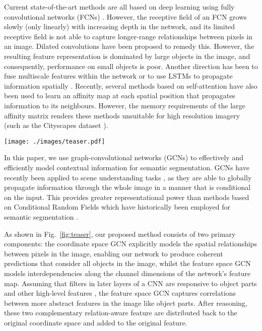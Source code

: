 \documentclass{bmvc2k}
\begin{document}
Current state-of-the-art methods are all based on deep learning using fully convolutional networks (FCNs) \cite{fcn}.
However, the receptive field of an FCN grows slowly (only linearly) with increasing depth in the network, and its limited receptive field is not able to capture longer-range relationships between pixels in an image.
Dilated convolutions \cite{deeplabv1, dilation} have been proposed to remedy this.
However, the resulting feature representation is dominated by large objects in the image, and consequently, performance on small objects is poor.
Another direction has been to fuse multiscale features within the network \cite{pspnet,parsenet,hou2020strip} or to use LSTMs to propagate information spatially \cite{lstmseg,dagseg}.
Recently, several methods based on self-attention \cite{Nonlocal,DAnet,ocnet,li2019global} have also been used to learn an affinity map at each spatial position that propagates information to its neighbours.
However, the memory requirements of the large affinity matrix renders these methods unsuitable for high resolution imagery (such as the Cityscapes dataset \cite{Cityscapes}).

\begin{figure*}
	\centering
	\texttt{[image: ./images/teaser.pdf]}
	\caption{Our proposed \emph{DGCNet} exploits contextual information across the whole image by
	proposing a graph convolutional network to efficiently propagate information along both the spatial and channel dimensions of a convolutional feature map.}
	\label{fig:teaser}
\end{figure*}


In this paper, we use graph-convolutional networks (GCNs) \cite{gcnpaper} to effectively and efficiently model contextual information for semantic segmentation.
GCNs have recently been applied to scene understanding tasks \cite{beyond_grids,graph_reason,SGR_gcn,zhang2020dynamic}, as they are able to globally propagate information through the whole image in a manner that is conditional on the input.
This provides greater representational power than methods based on Conditional Random Fields \cite{zheng2015conditional, deeplabv1, arnab2018conditional} which have historically been employed for semantic segmentation \cite{he2004multiscale,shotton2006textonboost}.

As shown in Fig.~\ref{fig:teaser}, our proposed method consists of two primary components: the coordinate space GCN explicitly models the spatial relationships between pixels in the image, enabling our network to produce coherent predictions that consider all objects in the image, whilst the feature space GCN models interdependencies along the channel dimensions of the network's feature map. 
Assuming that filters in later layers of a CNN are responsive to object parts and other high-level features \cite{zeiler2014visualizing}, the feature space GCN captures correlations between more abstract features in the image like object parts. 
After reasoning, these two complementary relation-aware feature are distributed back to the original coordinate space and added to the original feature. 
\end{document}
